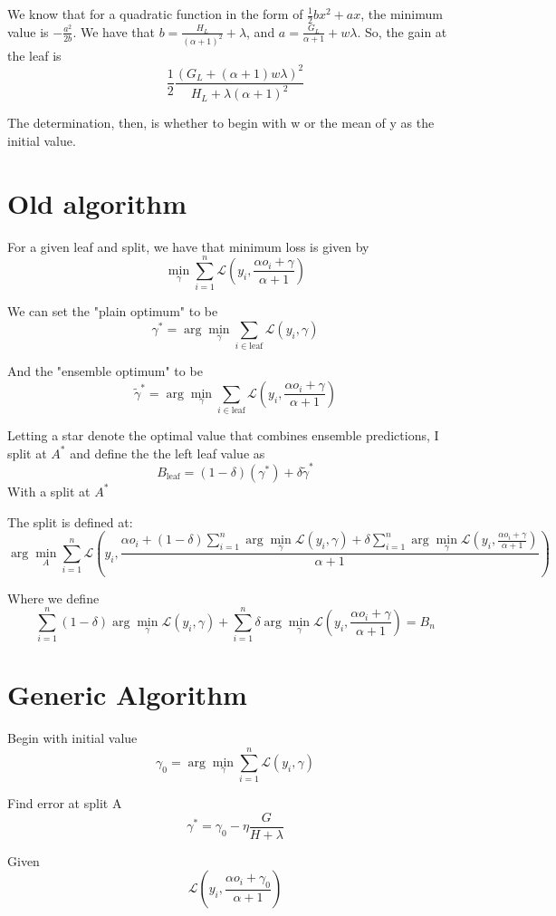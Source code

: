 \documentclass{article}
\begin{document}
We know that for a quadratic function in the form of $\frac{1}{2}bx^2 + ax$, the minimum value is $- \frac{a^2}{2b}$. 
We have that $b = \frac{H_L}{(\alpha + 1)^2} + \lambda$, and $a = \frac{G_L}{\alpha + 1} + w\lambda$. So, the gain at the leaf is \[
\frac{1}{2} \frac{(G_L + (\alpha + 1)w\lambda)^2}{H_L + \lambda(\alpha + 1)^2}
\]

The determination, then, is whether to begin with w or the mean of y as the initial value.

\section*{Old algorithm}

For a given leaf and split, we have that minimum loss is given by \[
\min_{\gamma} \sum_{i=1}^{n} \mathcal{L}(y_i, \frac{\alpha o_i + \gamma}{\alpha + 1})
\]

We can set the "plain optimum" to be \[
\gamma^* = \arg \min_\gamma \sum_{i \in \text{leaf}} \mathcal{L}(y_i, \gamma)
\]

And the "ensemble optimum" to be \[
\tilde{\gamma}^* = \arg \min_\gamma \sum_{i \in \text{leaf}} \mathcal{L}(y_i, \frac{\alpha o_i + \gamma}{\alpha + 1})
\]

Letting a star denote the optimal value that combines ensemble predictions, I split at $A^*$ and define the 
the left leaf value as 
\[
B_{\text{leaf}} = (1 - \delta)(\gamma^*) + \delta \tilde{\gamma}^*
\]
With a split at $A^*$

The split is defined at:
\[
\arg\min_A \sum_{i=1}^n \mathcal{L}(y_i, \frac{\alpha o_i + (1 - \delta)\sum_{i=1}^n \arg\min_{\gamma} \mathcal{L}(y_i, \gamma) + \delta \sum_{i=1}^n \arg\min_\gamma \mathcal{L}(y_i, \frac{\alpha o_i + \gamma}{\alpha + 1})}{\alpha + 1})
\]

Where we define \[
    \sum_{i=1}^n (1 - \delta)\arg\min_{\gamma} \mathcal{L}(y_i, \gamma) + \sum_{i=1}^n \delta \arg\min_\gamma \mathcal{L}(y_i, \frac{\alpha o_i + \gamma}{\alpha + 1}) = B_n
\]

\section*{Generic Algorithm}
Begin with initial value \[
    \gamma_0 = \arg\min_{\gamma} \sum_{i=1}^n \mathcal{L}(y_i, \gamma)
\]

Find error at split A \[
\gamma^* = \gamma_0 - \eta \frac{G}{H + \lambda}
\]

Given \[
\mathcal{L}(y_i, \frac{\alpha o_i + \gamma_0}{\alpha + 1})
\]
\end{document}
